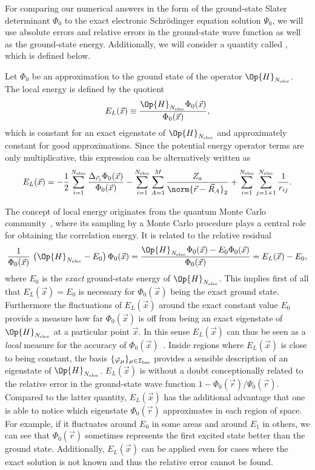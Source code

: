 For comparing our numerical answers in the form of the \HF
ground-state Slater determinant $\Phi_0$
to the exact electronic Schrödinger equation solution $\Psi_0$,
we will use absolute errors and relative errors in the ground-state wave function
as well as the ground-state energy.
Additionally, we will consider a quantity called ,
which is defined below.
\begin{defn}
	Let $\Phi_0$ be an approximation to the ground state
	of the operator $\Op{H}_{\Nelec}$.
	The local energy is defined by the quotient
	\begin{equation}
		E_L(\vec{x}) \equiv \frac{\Op{H}_{\Nelec} \Phi_0(\vec{x})}{\Phi_0(\vec{x})},
		\label{eqn:LocalEnergy}
	\end{equation}
	which is constant for an exact eigenstate of $\Op{H}_{\Nelec}$
	and approximately constant for good approximations.
	Since the potential energy operator terms are only multiplicative,
	this expression can be alternatively written as
	\[
		E_L(\vec{x})
		= -\frac12 \sum_{i=1}^{\Nelec} \frac{\Delta_{\vec{r}_i} \Phi_0(\vec{x})}{\Phi_0(\vec{x})}
		- \sum_{i=1}^{\Nelec} \sum_{A=1}^M \frac{Z_a}{\norm{\vec{r} - \vec{R}_A}_2}
		+ \sum_{i=1}^{\Nelec} \sum_{j=1+1}^{\Nelec} \frac{1}{r_{ij}}.
	\]
\end{defn}
The concept of local energy originates from the
quantum Monte Carlo community~\cite{Foulkes2001,Ma2005},
where its sampling by a Monte Carlo procedure plays a central role
for obtaining the correlation energy.
It is related to the relative residual
\[
	\frac{1}{\Phi_0(\vec{x})} \, \left(\Op{H}_{\Nelec} - E_0\right) \Phi_0(\vec{x}) =
	\frac{\Op{H}_{\Nelec} \Phi_0(\vec{x}) - E_0 \Phi_0(\vec{x})}{\Phi_0(\vec{x})}
	= E_L(\vec{x}) - E_0,
\]
where $E_0$ is the \emph{exact} ground-state energy of $\Op{H}_{\Nelec}$.
This implies first of all
that $E_L(\vec{x}) = E_0$ is necessary for $\Phi_0(\vec{x})$ being the exact ground state.
Furthermore the fluctuations of $E_L(\vec{x})$ around the exact constant value $E_0$
provide a measure how far $\Phi_0(\vec{x})$ is off from being an
exact eigenstate of $\Op{H}_{\Nelec}$ at a particular point $\vec{x}$.
In this sense $E_L(\vec{x})$ can thus be seen as a \emph{local} measure
for the accuracy of $\Phi_0(\vec{x})$~\cite{Hoggan2009}.
Inside regions where $E_L(\vec{x})$ is close to being constant,
the basis $\{\varphi_\mu\}_{\mu\in\mathcal{I}_\text{bas}}$ provides a sensible description
of an eigenstate of $\Op{H}_{\Nelec}$.
$E_L(\vec{x})$ is without a doubt conceptionally related to the
relative error in the ground-state wave function $1 - \Phi_0(\vec{r}) / \Psi_0(\vec{r})$.
Compared to the latter quantity, $E_L(\vec{x})$
has the additional advantage that one is able to notice
which eigenstate $\Phi_0(\vec{r})$ approximates in each region of space.
For example, if it fluctuates around $E_0$ in some areas and around $E_1$ in others,
we can see that $\Phi_0(\vec{r})$ sometimes represents the first excited state
better than the ground state.
Additionally, $E_L(\vec{x})$ can be applied even for cases where
the exact solution is not known and thus the relative error cannot be found.

